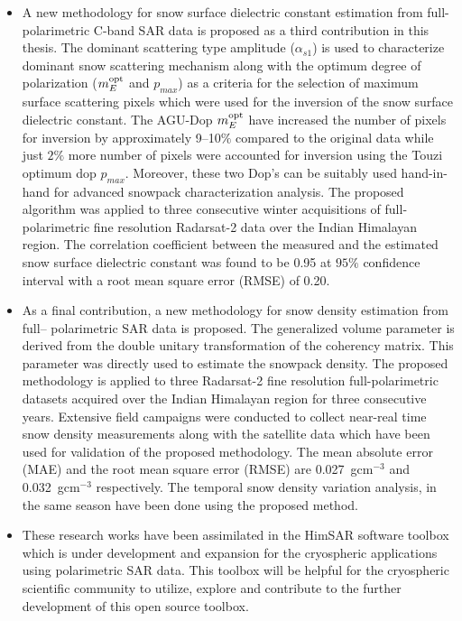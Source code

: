 \begin{itemize}
	\item A new methodology for snow surface dielectric constant estimation from  full-polarimetric C-band SAR data is proposed as a third contribution in this thesis. The dominant scattering type amplitude ($\alpha_{s1}$) is used to characterize dominant snow scattering mechanism along with the optimum degree of polarization ($m_{E}^{\mbox{\scriptsize opt}}$ and $p_{max}$) as a criteria for the selection of maximum surface scattering pixels which were used for the inversion of the snow surface dielectric constant. The AGU-Dop $m_{E}^{\mbox{\scriptsize opt}}$ have increased the number of pixels for inversion by approximately 9--10$\%$ compared to the original data while just $2\%$ more number of pixels were accounted for inversion using the Touzi optimum dop $p_{max}$. Moreover, these two Dop's can be suitably used hand-in-hand for advanced snowpack characterization analysis. The proposed algorithm was applied to three consecutive winter acquisitions of full-polarimetric fine resolution Radarsat-2 data over the Indian Himalayan region. The correlation coefficient between the measured and the estimated snow surface dielectric constant was found to be 0.95 at $95\%$ confidence interval with a root mean square error (RMSE) of 0.20.
	
	\item As a final contribution, a new methodology for snow density estimation from full-- polarimetric SAR data is proposed. The generalized volume parameter is derived from the double unitary transformation of the coherency matrix. This parameter was directly used to estimate the snowpack density. The proposed methodology is applied to three Radarsat-2 fine resolution full-polarimetric datasets acquired over the Indian Himalayan region for three consecutive years. Extensive field campaigns were conducted to collect near-real time snow density measurements along with the satellite data which have been used for validation of the proposed methodology. The mean absolute error (MAE) and the root mean square error (RMSE) are 0.027~gcm$^{-3}$ and 0.032~gcm$^{-3}$ respectively. The temporal snow density variation analysis, in the same season have been done  using the proposed method. 
	
	\item These research works have been assimilated in the HimSAR software toolbox which is under development and expansion for the cryospheric applications using polarimetric SAR data. This toolbox will be helpful for the cryospheric scientific community to utilize, explore and contribute to the further development of this open source toolbox.
	   
\end{itemize}
